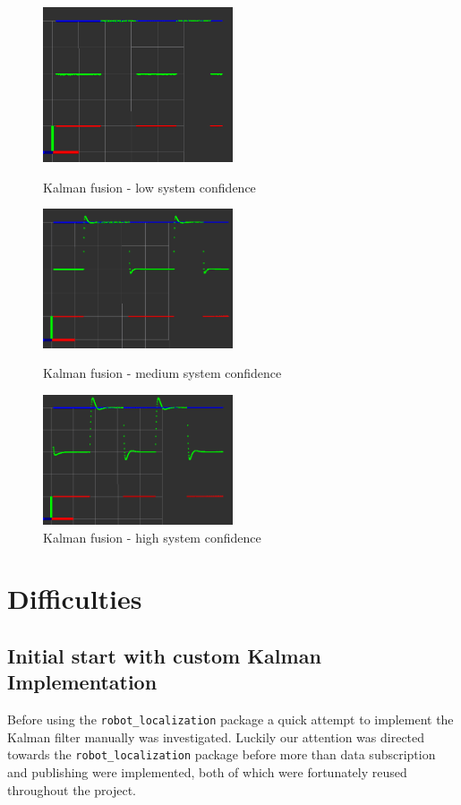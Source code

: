 \begin{figure}[thpb]
      \centering
      \includegraphics[width=0.5\textwidth]{graphics/kalman_fast.png}
      \caption{Kalman fusion - low system confidence}
      \label{Fig: Kalman Fusion - Low}
\vspace{20pt}
      \includegraphics[width=0.5\textwidth]{graphics/kalman_medium.png}
      \caption{Kalman fusion - medium system confidence}
      \label{Fig: Kalman Fusion - Medium}
\vspace{20pt}
      \centering
      \includegraphics[width=0.5\textwidth]{graphics/kalman_slow.png}
      \caption{Kalman fusion - high system confidence}
      \label{Fig: Kalman Fusion - High}
\end{figure}

\section{Difficulties}
\subsection{Initial start with custom Kalman Implementation}
Before using the \texttt{robot\_localization} package a quick attempt to implement the Kalman filter manually was investigated. Luckily our attention was directed towards the \texttt{robot\_localization} package before more than data subscription and publishing were implemented, both of which were fortunately reused throughout the project.

